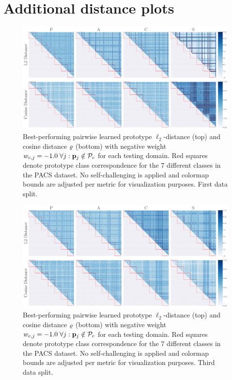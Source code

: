 \chapter{Additional distance plots}
\label{sec:additional_distances}

\begin{figure}[ht]
    \centering
    \includegraphics[width=\textwidth]{Figures/Chapter4/2021-01-21-ProDropIncorrectWeight-1.0SAVEResNet18oracle_validation_trial0.pdf}
    \caption[First data split pairwise prototype distances with $w_{c,j} = -1.0$] {Best-performing pairwise learned prototype $\ell_2$-distance (top) and cosine distance $\varrho$ (bottom) with negative weight $w_{c,j} = -1.0\; \forall j: \mathbf{p}_{j} \notin \mathcal{P}_c$ for each testing domain. Red squares denote prototype class correspondence for the $7$ different classes in the PACS dataset. No self-challenging is applied and colormap bounds are adjusted per metric for visualization purposes. First data split.}
    \label{fig:pairwise_distance}
\end{figure}

\begin{figure}[ht]
    \centering
    \includegraphics[width=\textwidth]{Figures/Chapter4/2021-01-21-ProDropIncorrectWeight-1.0SAVEResNet18oracle_validation_trial2.pdf}
    \caption[Third data split pairwise prototype distances with $w_{c,j} = -1.0$] {Best-performing pairwise learned prototype $\ell_2$-distance (top) and cosine distance $\varrho$ (bottom) with negative weight $w_{c,j} = -1.0\; \forall j: \mathbf{p}_{j} \notin \mathcal{P}_c$ for each testing domain. Red squares denote prototype class correspondence for the $7$ different classes in the PACS dataset. No self-challenging is applied and colormap bounds are adjusted per metric for visualization purposes. Third data split.}
    \label{fig:pw_distance_trial2}
\end{figure}

